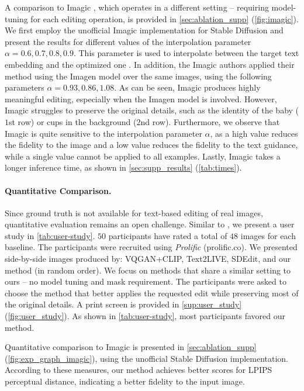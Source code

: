 A comparison to Imagic \cite{Kawar2022ImagicTR}, which operates in a different setting -- requiring model-tuning for each editing operation, is provided in \cref{sec:ablation_supp} (\cref{fig:imagic}). We first employ the unofficial Imagic implementation for Stable Diffusion and present the results for different values of the interpolation parameter $\alpha = 0.6,0.7,0.8,0.9$. This parameter is used to interpolate between the target text embedding and the optimized one \cite{Kawar2022ImagicTR}. In addition, the Imagic authors applied their method using the Imagen model over the same images, using the following parameters $\alpha=0.93, 0.86, 1.08$.
As can be seen, Imagic produces highly meaningful editing, especially when the Imagen model is involved.
However, Imagic struggles to preserve the original details, such as the identity of the baby ($1$st row) or cups in the background ($2$nd row). Furthermore, we observe that Imagic is quite sensitive to the interpolation parameter $\alpha$, as a high value reduces the fidelity to the image and a low value reduces the fidelity to the text guidance, while a single value cannot be applied to all examples. Lastly, Imagic takes a longer inference time, as shown in \cref{sec:supp_results} (\cref{tab:times}).





\vspace{-0.3cm}
\paragraph{Quantitative Comparison.}

Since ground truth is not available for text-based editing of real images, quantitative evaluation remains an open challenge. Similar to \cite{bar2022text2live, hertz2022prompt}, we present a user study in \cref{tab:user-study}. $50$ participants have rated a total of $48$ images for each baseline. The participants were recruited using \emph{Prolific} (prolific.co). We presented side-by-side images produced by: VQGAN+CLIP, Text2LIVE, SDEdit, and our method (in random order). We focus on methods that share a similar setting to ours -- no model tuning and mask requirement. The participants were asked to choose the method that better applies the requested edit while preserving most of the original details. A print screen is provided in \cref{sup:user_study} (\cref{fig:user_study}).
As shown in \cref{tab:user-study}, most participants favored our method.


Quantitative comparison to Imagic is presented in \cref{sec:ablation_supp} (\cref{fig:exp_graph_imagic}), using the unofficial Stable Diffusion implementation. According to these measures, our method achieves better scores for LPIPS perceptual distance, indicating a better fidelity to the input image.

